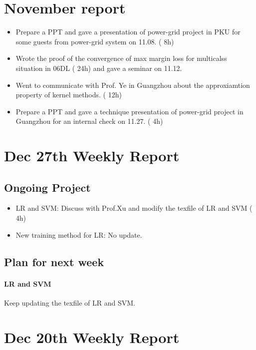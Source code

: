 \documentclass[10pt]{amsart}
\begin{document}
\section{November report}
\begin{itemize}
	\item Prepare a PPT and gave a presentation of power-grid project in PKU for some guests from power-grid system on 11.08. ({\color{blue} 8h})\\
	\item {\color{red} Wrote the proof of the convergence of max margin loss for multicalss situation in 06DL} ({\color{blue} 24h}) and gave a seminar on 11.12.\\
	\item Went to communicate with Prof. Ye in Guangzhou about the approxiamtion property of kernel methods. ({\color{blue} 12h})\\
	\item Prepare a PPT and gave a technique presentation of power-grid project in Guangzhou for an internal check on 11.27. ({\color{blue} 4h})\\
\end{itemize}

\section{Dec 27th Weekly Report} %

\subsection{Ongoing Project}
\begin{itemize}
	\item LR and SVM: {\color{red} Discuss with Prof.Xu and modify the texfile of LR and SVM} ({\color{blue} 4h})
	\item New training method for LR: No update.
	
\end{itemize}

\subsection{Plan for next week}
\paragraph{LR and SVM}
Keep updating the texfile of LR and SVM.

\section{Dec 20th Weekly Report} %
\end{document}
